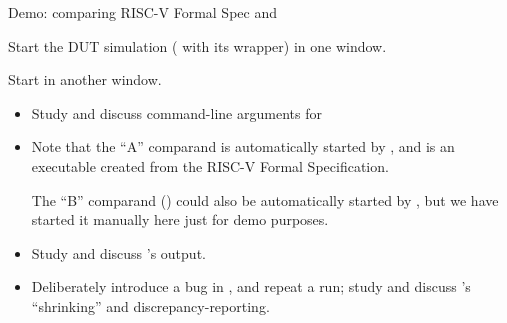 \begin{frame}[fragile]

\begin{center}

  \vstrut{0em}{10ex}

  {\LARGE Demo: {\TESTRIG} comparing {\SAIL} RISC-V Formal Spec and {\FIFE}}

  \vspace*{5ex}\scriptsize

  \begin{minipage}{0.9\textwidth}

    Start the DUT simulation ({\FIFE} with its {\TESTRIG} wrapper) in one window.

    \vspace*{2ex}

    Start {\TESTRIG} in another window.
    \begin{itemize}
      \item Study and discuss command-line arguments for {\TESTRIG}

      \vspace*{1ex}

      \item Note that the ``A'' comparand is automatically started by
        {\TESTRIG}, and is an executable created from the {\SAIL} RISC-V
        Formal Specification.

        The ``B'' comparand ({\FIFE}) could also be automatically
        started by {\TESTRIG}, but we have started it manually here
        just for demo purposes.

      \vspace*{1ex}

      \item Study and discuss {\TESTRIG}'s output.

      \vspace*{1ex}

      \item Deliberately introduce a bug in {\FIFE}, and repeat a run;
            study and discuss {\TESTRIG}'s ``shrinking'' and
            discrepancy-reporting.

    \end{itemize}

  \end{minipage}

\end{center}

\end{frame}

